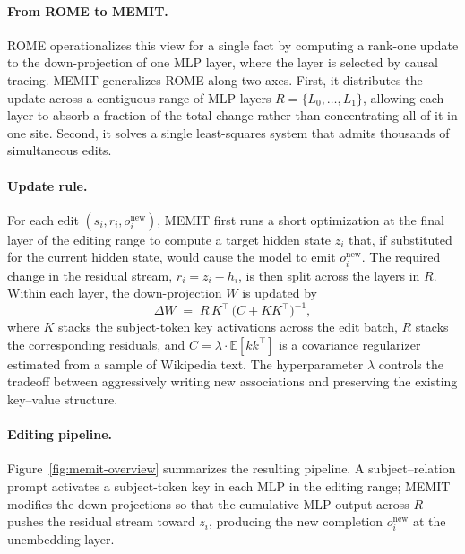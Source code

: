 \paragraph{From ROME to MEMIT.}
ROME \cite{meng2023locatingeditingfactualassociations} operationalizes this view for a single fact by computing a rank-one update to the down-projection of one MLP layer, where the layer is selected by causal tracing. MEMIT generalizes ROME along two axes. First, it distributes the update across a contiguous range of MLP layers $R = \{L_0, \dots, L_1\}$, allowing each layer to absorb a fraction of the total change rather than concentrating all of it in one site. Second, it solves a single least-squares system that admits thousands of simultaneous edits.

\paragraph{Update rule.}
For each edit $(s_i, r_i, o^{\text{new}}_i)$, MEMIT first runs a short optimization at the final layer of the editing range to compute a target hidden state $z_i$ that, if substituted for the current hidden state, would cause the model to emit $o^{\text{new}}_i$. The required change in the residual stream, $r_i = z_i - h_i$, is then split across the layers in $R$. Within each layer, the down-projection $W$ is updated by
\begin{equation}
\Delta W \;=\; R\, K^{\top}\, \bigl(C + K K^{\top}\bigr)^{-1},
\label{eq:memit}
\end{equation}
where $K$ stacks the subject-token key activations across the edit batch, $R$ stacks the corresponding residuals, and $C = \lambda \cdot \mathbb{E}[k k^{\top}]$ is a covariance regularizer estimated from a sample of Wikipedia text. The hyperparameter $\lambda$ controls the tradeoff between aggressively writing new associations and preserving the existing key--value structure.

\paragraph{Editing pipeline.}
Figure~\ref{fig:memit-overview} summarizes the resulting pipeline. A subject--relation prompt activates a subject-token key in each MLP in the editing range; MEMIT modifies the down-projections so that the cumulative MLP output across $R$ pushes the residual stream toward $z_i$, producing the new completion $o^{\text{new}}_i$ at the unembedding layer.

